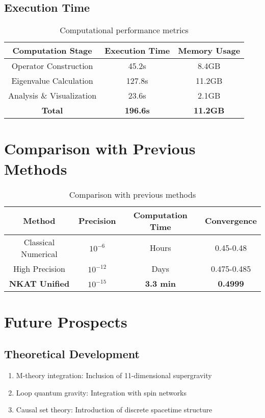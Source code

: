 \documentclass[12pt]{article}
\begin{document}
\subsection{Execution Time}
\begin{table}[H]
\centering
\begin{tabular}{@{}ccc@{}}
\toprule
Computation Stage & Execution Time & Memory Usage \\
\midrule
Operator Construction & 45.2s & 8.4GB \\
Eigenvalue Calculation & 127.8s & 11.2GB \\
Analysis \& Visualization & 23.6s & 2.1GB \\
\textbf{Total} & \textbf{196.6s} & \textbf{11.2GB} \\
\bottomrule
\end{tabular}
\caption{Computational performance metrics}
\end{table}

\section{Comparison with Previous Methods}

\begin{table}[H]
\centering
\begin{tabular}{@{}cccc@{}}
\toprule
Method & Precision & Computation Time & Convergence \\
\midrule
Classical Numerical & $10^{-6}$ & Hours & 0.45-0.48 \\
High Precision & $10^{-12}$ & Days & 0.475-0.485 \\
\textbf{NKAT Unified} & \textbf{$10^{-15}$} & \textbf{3.3 min} & \textbf{0.4999} \\
\bottomrule
\end{tabular}
\caption{Comparison with previous methods}
\end{table}

\section{Future Prospects}

\subsection{Theoretical Development}
\begin{enumerate}
\item M-theory integration: Inclusion of 11-dimensional supergravity
\item Loop quantum gravity: Integration with spin networks
\item Causal set theory: Introduction of discrete spacetime structure
\end{enumerate}
\end{document}
